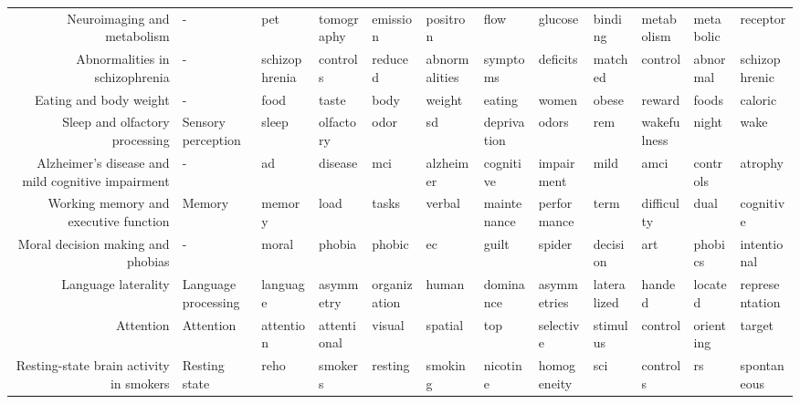 \documentclass[english]{article}
\begin{document}
\begin{landscape}
\begin{center}
\begin{supertabular}{rlllllllllll}
         Neuroimaging and metabolism &                   - &              pet &    tomography &        emission &       positron &        flow &        glucose &       binding &     metabolism &     metabolic &       receptor \\
      Abnormalities in schizophrenia &                   - &    schizophrenia &      controls &         reduced &  abnormalities &    symptoms &       deficits &       matched &        control &      abnormal &  schizophrenic \\
              Eating and body weight &                   - &             food &         taste &            body &         weight &      eating &          women &         obese &         reward &         foods &        caloric \\
      Sleep and olfactory processing &  Sensory perception &            sleep &     olfactory &            odor &             sd & deprivation &          odors &           rem &    wakefulness &         night &           wake \\
Alzheimer's disease and mild cognitive impairment &                   - &               ad &       disease &             mci &      alzheimer &   cognitive &     impairment &          mild &           amci &      controls &        atrophy \\
Working memory and executive function &              Memory &           memory &          load &           tasks &         verbal & maintenance &    performance &          term &     difficulty &          dual &      cognitive \\
   Moral decision making and phobias &                   - &            moral &        phobia &          phobic &             ec &       guilt &         spider &      decision &            art &       phobics &    intentional \\
                 Language laterality & Language processing &         language &     asymmetry &    organization &          human &   dominance &    asymmetries &   lateralized &         handed &       located & representation \\
                           Attention &           Attention &        attention &   attentional &          visual &        spatial &         top &      selective &      stimulus &        control &     orienting &         target \\
Resting-state brain activity in smokers &       Resting state &             reho &       smokers &         resting &        smoking &    nicotine &    homogeneity &           sci &       controls &            rs &    spontaneous \\

\end{supertabular}
\end{center}
\end{landscape}
\end{document}
